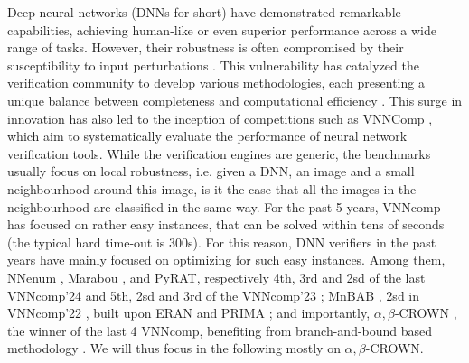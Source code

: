 Deep neural networks (DNNs for short) have demonstrated remarkable capabilities, achieving human-like or even superior performance across a wide range of tasks. However, their robustness is often compromised by their susceptibility to input perturbations \cite{szegedy}. This vulnerability has catalyzed the verification community to develop various methodologies, each presenting a unique balance between completeness and computational efficiency \cite{Marabou,Reluplex,deeppoly}. This surge in innovation has also led to the inception of competitions such as VNNComp \cite{VNNcomp}, which aim to systematically evaluate the performance of neural network verification tools. While the verification engines are generic, the benchmarks usually focus on local robustness, i.e. given a DNN, an image and a small neighbourhood around this image, is it the case that all the images in the neighbourhood are classified in the same way. 
For the past 5 years, VNNcomp has focused on rather easy instances, that can be solved within tens of seconds (the typical hard time-out is 300s). For this reason, DNN verifiers in the past years have mainly focused on optimizing for such easy instances. Among them, NNenum \cite{nnenum}, Marabou \cite{Marabou, Marabou2}, and PyRAT, respectively 4th, 3rd and 2sd of the last VNNcomp'24 \cite{VNNcomp24}
and 5th, 2sd and 3rd  of the VNNcomp'23 \cite{VNNcomp23}; MnBAB \cite{ferrari2022complete}, 2sd in VNNcomp'22 \cite{VNNcomp22}, built upon ERAN \cite{deeppoly} and PRIMA \cite{prima}; and importantly, $\alpha,\beta$-CROWN \cite{crown,xu2020fast}, the winner of the last 4 VNNcomp, benefiting from branch-and-bound based methodology \cite{cutting,BaB}.
We will thus focus in the following mostly on $\alpha,\beta$-CROWN.

